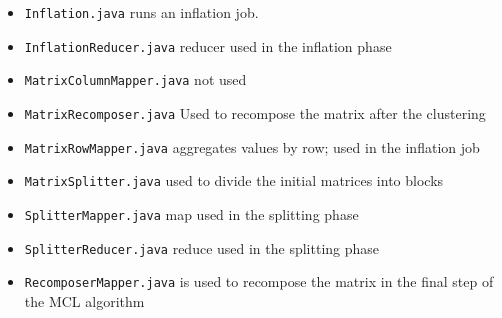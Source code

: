 \begin{itemize}
\item \texttt{Inflation.java} runs an inflation job.
\item \texttt{InflationReducer.java} reducer used in the inflation phase
\item \texttt{MatrixColumnMapper.java} not used
\item \texttt{MatrixRecomposer.java} Used to recompose the matrix after the clustering
\item \texttt{MatrixRowMapper.java} aggregates values by row; used in the inflation job
\item \texttt{MatrixSplitter.java} used to divide the initial matrices into blocks
\item \texttt{SplitterMapper.java} map used in the splitting phase
\item \texttt{SplitterReducer.java} reduce used in the splitting phase
\item \texttt{RecomposerMapper.java} is used to recompose the matrix in the final step of the MCL algorithm
\end{itemize}

